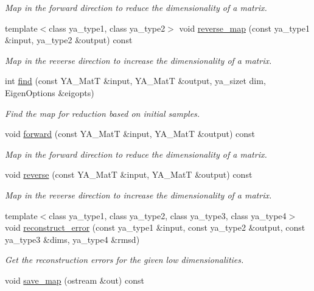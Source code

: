 \begin{CompactItemize}
\begin{CompactList}\small\item\em Map in the forward direction to reduce the dimensionality of a matrix. \item\end{CompactList}\item 
\hypertarget{class_y_a_p_c_a_reduce_a7}{
template$<$class ya\_\-type1, class ya\_\-type2$>$ void \hyperlink{class_y_a_p_c_a_reduce_a7}{reverse\_\-map} (const ya\_\-type1 \&input, ya\_\-type2 \&output) const }
\label{class_y_a_p_c_a_reduce_a7}

\begin{CompactList}\small\item\em Map in the reverse direction to increase the dimensionality of a matrix. \item\end{CompactList}\item 
int \hyperlink{class_y_a_p_c_a_reduce_a8}{find} (const YA\_\-Mat\-T \&input, YA\_\-Mat\-T \&output, ya\_\-sizet dim, Eigen\-Options \&eigopts)
\begin{CompactList}\small\item\em Find the map for reduction based on initial samples. \item\end{CompactList}\item 
\hypertarget{class_y_a_p_c_a_reduce_a9}{
void \hyperlink{class_y_a_p_c_a_reduce_a9}{forward} (const YA\_\-Mat\-T \&input, YA\_\-Mat\-T \&output) const }
\label{class_y_a_p_c_a_reduce_a9}

\begin{CompactList}\small\item\em Map in the forward direction to reduce the dimensionality of a matrix. \item\end{CompactList}\item 
\hypertarget{class_y_a_p_c_a_reduce_a10}{
void \hyperlink{class_y_a_p_c_a_reduce_a10}{reverse} (const YA\_\-Mat\-T \&input, YA\_\-Mat\-T \&output) const }
\label{class_y_a_p_c_a_reduce_a10}

\begin{CompactList}\small\item\em Map in the reverse direction to increase the dimensionality of a matrix. \item\end{CompactList}\item 
template$<$class ya\_\-type1, class ya\_\-type2, class ya\_\-type3, class ya\_\-type4$>$ void \hyperlink{class_y_a_p_c_a_reduce_a11}{reconstruct\_\-error} (const ya\_\-type1 \&input, const ya\_\-type2 \&output, const ya\_\-type3 \&dims, ya\_\-type4 \&rmsd)
\begin{CompactList}\small\item\em Get the reconstruction errors for the given low dimensionalities. \item\end{CompactList}\item 
\hypertarget{class_y_a_p_c_a_reduce_a12}{
void \hyperlink{class_y_a_p_c_a_reduce_a12}{save\_\-map} (ostream \&out) const }
\label{class_y_a_p_c_a_reduce_a12}


\end{CompactItemize}
